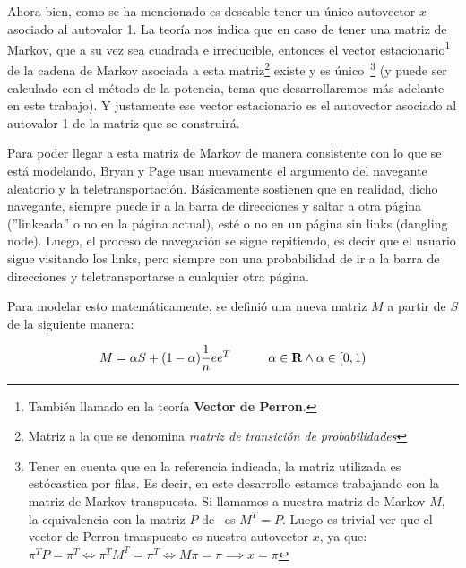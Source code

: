 \par Ahora bien, como se ha mencionado es deseable tener un \'unico autovector
$x$ asociado al autovalor 1. La teor\'ia nos indica que en caso de tener una
matriz de Markov, que a su vez sea cuadrada e irreducible, entonces el vector
estacionario\footnote{Tambi\'en llamado en la teor\'ia \textbf{Vector de
Perron}.} de la cadena de Markov asociada a esta matriz\footnote{Matriz a la que
se denomina \emph{matriz de transici\'on de probabilidades}} existe y es
\'unico~\cite[p.693]{Meyer2000}\footnote{Tener en cuenta que en la referencia
indicada, la matriz utilizada es est\'ocastica por filas. Es decir, en este
desarrollo estamos trabajando con la matriz de Markov transpuesta. Si llamamos a
nuestra matriz de Markov $M$, la equivalencia con la matriz $P$
de~\cite[p.693]{Meyer2000} es $M^T = P$. Luego es trivial ver que el vector de
Perron transpuesto es nuestro autovector $x$, ya que: $\pi^TP =\pi^T \iff
\pi^TM^T=\pi^T \iff M\pi=\pi \implies x=\pi$} (y puede ser calculado con el
m\'etodo de la potencia, tema que desarrollaremos m\'as adelante en este
trabajo). Y justamente ese vector estacionario es el autovector asociado al
autovalor 1 de la matriz que se construir\'a.

\par Para poder llegar a esta matriz de Markov de manera consistente con lo
que se est\'a modelando, Bryan y Page usan nuevamente el argumento del navegante
aleatorio y la teletransportaci\'on.  B\'asicamente sostienen que en realidad,
dicho navegante, siempre puede ir a la barra de direcciones y saltar a otra
p\'agina (''linkeada'' o no en la p\'agina actual), est\'e o no en un p\'agina
sin links (dangling node). Luego, el proceso de navegaci\'on se sigue
repitiendo, es decir que el usuario sigue visitando los links, pero siempre con
una probabilidad de ir a la barra de direcciones y teletransportarse a cualquier
otra p\'agina.

\par Para modelar esto matem\'aticamente, se defini\'o una nueva matriz
$M$ a partir de $S$ de la siguiente manera:

\begin{equation}
    M = \alpha S + (1-\alpha) \frac{1}{n}ee^T
    \quad\quad\quad \alpha\in\hbox{\bf R} \land \alpha\in\left[0,1\right)
\end{equation}

